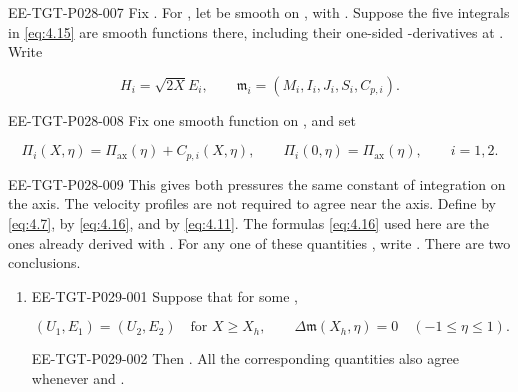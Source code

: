 \begin{lemma}\label{lem:4.4}
\begin{EESegment}{EE-TGT-P028-007}
Fix . For
, let  be smooth on
, with
. Suppose the five integrals in
\eqref{eq:4.15} are smooth functions there, including their one-sided
-derivatives at
. Write
\end{EESegment}
\[
 H_i=\sqrt{2X}E_i,\qquad
 \mathfrak m_i=(M_i,I_i,J_i,S_i,C_{p,i}).
\]
\begin{EESegment}{EE-TGT-P028-008}
Fix one smooth function  on
, and set
\end{EESegment}
\[
 \Pi_i(X,\eta)=\Pi_{\mathrm{ax}}(\eta)+C_{p,i}(X,\eta),
 \qquad
 \Pi_i(0,\eta)=\Pi_{\mathrm{ax}}(\eta),
 \qquad i=1,2.
\]
\begin{EESegment}{EE-TGT-P028-009}
This gives both pressures the same constant of integration on the axis. The
velocity profiles are not required to agree near the axis. Define
 by \eqref{eq:4.7},
 by \eqref{eq:4.16}, and
 by
\eqref{eq:4.11}. The formulas \eqref{eq:4.16} used here are the ones already
derived with . For any one of these quantities
, write
. There are two conclusions.
\end{EESegment}
%
\begin{enumerate}[label=\textup{(\roman*)},leftmargin=2.5em]
\item
\begin{EESegment}{EE-TGT-P029-001}
Suppose that for some ,
\end{EESegment}
\[
 (U_1,E_1)=(U_2,E_2)\quad\text{for }X\geq X_h,
 \qquad
 \Delta\mathfrak m(X_h,\eta)=0\quad(-1\leq\eta\leq1).
\]
\begin{EESegment}{EE-TGT-P029-002}
Then . All the corresponding
quantities
 also agree whenever  and
.
\end{EESegment}


\end{enumerate}
\end{lemma}
